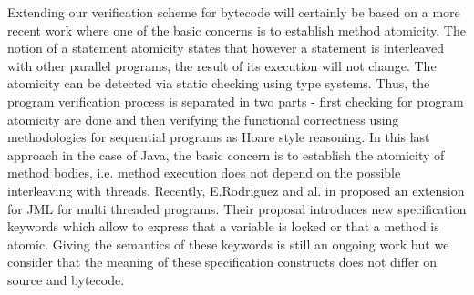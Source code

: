 Extending our verification scheme for bytecode will certainly be based on a more recent work  where one of the basic concerns is to establish method atomicity. 
The notion of a statement atomicity states  that however a statement is interleaved with other parallel programs, the result of its execution will not change.
The atomicity can be  detected via static checking \cite{TES03CF} using type systems. Thus, the program verification process is separated in two parts
- first checking for program atomicity  \cite{TES03CF} are done  
and then verifying the functional correctness using  methodologies for sequential programs as Hoare style reasoning. 
In this last approach in the case of Java, the basic concern is to establish the atomicity of method bodies, i.e. method 
execution does not depend on the possible interleaving with threads.
Recently, E.Rodriguez and al. in \cite{RodriguezDFHLR05} proposed an extension for JML for multi threaded
 programs. Their proposal introduces  new specification keywords which allow to express that a variable is locked or
 that a method is atomic. Giving the semantics of these keywords is still an ongoing work but we consider that
 the meaning of these specification constructs does not differ on source and bytecode. 
    
 



